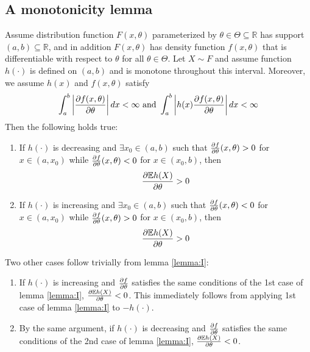 \ifx\phdthesis\undefined
\appendix
\else
\begin{subappendices}
\fi

\section{A monotonicity lemma}
\setcounter{equation}{0}
\begin{lemma} \label{lemma:I}
  Assume distribution function $F(x, \theta)$ parameterized by 
  $\theta \in \Theta \subseteq \mathbb R$ has support
  $(a, b) \subseteq \mathbb R$,
  and in addition $F(x, \theta)$ has density
  function $f(x, \theta)$ that is differentiable with respect to
  $\theta$ for all $\theta \in \Theta$.
  Let $X \sim F$ and assume function $h(\cdot)$ is defined on $(a, b)$
  and is monotone throughout this interval.
  Moreover, we assume $h(x)$ and $f(x, \theta)$ satisfy
  \begin{equation}\label{eq:frt}
    \int_a^b \left| {\partial f(x, \theta) \over \partial \theta} \right| dx
    < \infty \text { and }
    \int_a^b \left| h(x) {\partial f(x, \theta) \over \partial \theta} \right| dx
    < \infty
  \end{equation}
  Then the following holds true:
  \begin{enumerate}
  \item If $h(\cdot)$ is decreasing and $\exists x_0 \in (a, b)$ such that
    $\frac{\partial f}{\partial \theta}(x, \theta) > 0$ for $x \in (a, x_0)$ while
    $\frac{\partial f}{\partial \theta}(x, \theta) < 0$ for $x \in (x_0, b)$, then
    \[
    \frac{\partial \mathbb{E} h(X)}{\partial \theta} > 0
    \]
  \item If $h(\cdot)$ is increasing and $\exists x_0 \in (a, b)$ such that 
    $\frac{\partial f}{\partial \theta}(x, \theta) < 0$ for $x \in (a, x_0)$  while
    $\frac{\partial f}{\partial \theta}(x, \theta) > 0$ for $x \in (x_0, b)$, then
    \[
    \frac{\partial \mathbb{E} h(X)}{\partial \theta} > 0
    \]
  \end{enumerate}
\end{lemma}
\begin{remark}
  \label{remark:I}
  Two other cases follow trivially from lemma \ref{lemma:I}:
  \begin{enumerate}
  \item If $h(\cdot)$ is increasing and $\frac{\partial f}{\partial \theta}$
    satisfies the
    same conditions of the 1st case of lemma \ref{lemma:I},
    $\frac{\partial \mathbb{E} h(X)}{\partial \theta} < 0$. This immediately follows
    from applying 1st case of lemma \ref{lemma:I} to $-h(\cdot)$.
  \item By the same argument, if $h(\cdot)$ is decreasing and
    ${\partial f \over \partial \theta}$ satisfies the same conditions of the
    2nd case of lemma \ref{lemma:I}, ${\partial \mathbb{E} h(X) \over \partial \theta} < 0$.
  \end{enumerate}
\end{remark}


\end{subappendices}
